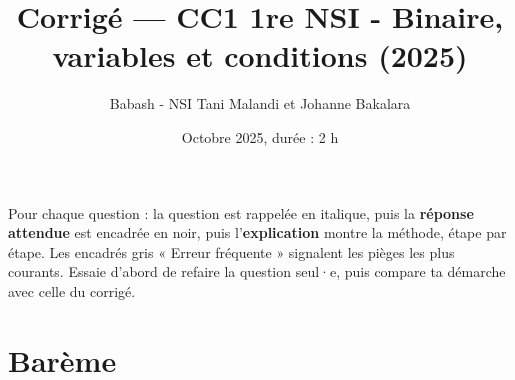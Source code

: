 \documentclass[addpoints, 11pt]{exam}
\title{Corrigé --- CC1 1re NSI - Binaire, variables et conditions (2025)}
\author{Babash - NSI Tani Malandi et Johanne Bakalara}
\date{Octobre 2025, durée : 2 h}
\DeclareRobustCommand{\_}{\textunderscore\allowbreak}
\begin{document}
\pagestyle{headandfoot}
\firstpageheader{}{}{}

\maketitle
\thispagestyle{headandfoot}

\begin{astuce}
Pour chaque question : la question est rappelée en italique, puis la \textbf{réponse attendue} est encadrée en noir, puis l'\textbf{explication} montre la méthode, étape par étape.
Les encadrés gris « Erreur fréquente » signalent les pièges les plus courants. Essaie d'abord de refaire la question seul·e, puis compare ta démarche avec celle du corrigé.
\end{astuce}

\section*{Barème}
\begin{center}
  \gradetable[h]
\end{center}
\end{document}

